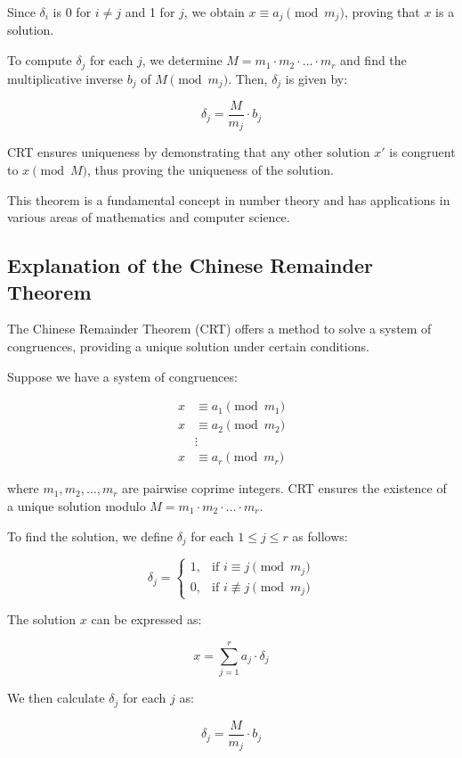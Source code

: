 \documentclass[11pt]{article}
\begin{document}
Since $\delta_i$ is 0 for $i \neq j$ and 1 for $j$, we obtain $x \equiv a_j \pmod{m_j}$, proving that $x$ is a solution.

To compute $\delta_j$ for each $j$, we determine $M = m_1 \cdot m_2 \cdot \ldots \cdot m_r$ and find the multiplicative inverse $b_j$ of $M \pmod{m_j}$. Then, $\delta_j$ is given by:

\[
\delta_j = \frac{M}{m_j} \cdot b_j
\]

CRT ensures uniqueness by demonstrating that any other solution $x'$ is congruent to $x \pmod{M}$, thus proving the uniqueness of the solution.

This theorem is a fundamental concept in number theory and has applications in various areas of mathematics and computer science.


\subsection{Explanation of the Chinese Remainder Theorem}

The Chinese Remainder Theorem (CRT) offers a method to solve a system of congruences, providing a unique solution under certain conditions.

Suppose we have a system of congruences:

\[
\begin{aligned}
x &\equiv a_1 \pmod{m_1} \\
x &\equiv a_2 \pmod{m_2} \\
&\vdots \\
x &\equiv a_r \pmod{m_r}
\end{aligned}
\]

where $m_1, m_2, \ldots, m_r$ are pairwise coprime integers. CRT ensures the existence of a unique solution modulo $M = m_1 \cdot m_2 \cdot \ldots \cdot m_r$.

To find the solution, we define $\delta_j$ for each $1 \leq j \leq r$ as follows:

\[
\delta_j =
\begin{cases}
1, & \text{if } i \equiv j \pmod{m_j} \\
0, & \text{if } i \not\equiv j \pmod{m_j}
\end{cases}
\]

The solution $x$ can be expressed as:

\[
x = \sum_{j=1}^{r} a_j \cdot \delta_j
\]

We then calculate $\delta_j$ for each $j$ as:

\[
\delta_j = \frac{M}{m_j} \cdot b_j
\]
\end{document}
